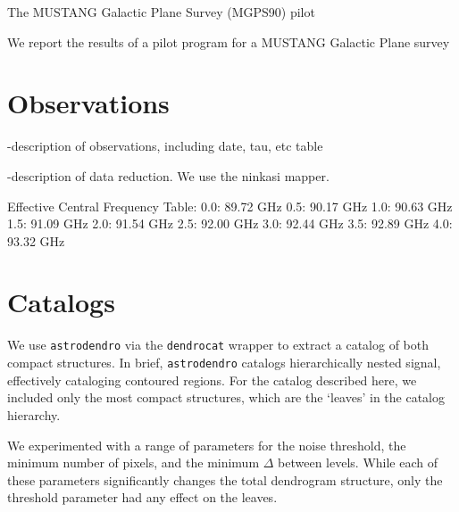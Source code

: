 
The MUSTANG Galactic Plane Survey (MGPS90) pilot

We report the results of a pilot program for a MUSTANG Galactic Plane survey

\section{Observations}

-description of observations, including date, tau, etc table

-description of data reduction.  We use the ninkasi mapper.


Effective Central Frequency Table:
0.0: 89.72 GHz
0.5: 90.17 GHz
1.0: 90.63 GHz
1.5: 91.09 GHz
2.0: 91.54 GHz
2.5: 92.00 GHz
3.0: 92.44 GHz
3.5: 92.89 GHz
4.0: 93.32 GHz

\section{Catalogs}

We use \texttt{astrodendro} via the \texttt{dendrocat} wrapper to extract a catalog of both compact structures.  In brief, \texttt{astrodendro} catalogs hierarchically nested signal, effectively cataloging contoured regions.  For the catalog described here, we included only the most compact structures, which are the `leaves' in the catalog hierarchy.

We experimented with a range of parameters for the noise threshold, the minimum number of pixels, and the minimum $\Delta$ between levels.  While each of these parameters significantly changes the total dendrogram structure, only the threshold parameter had any effect on the leaves.

